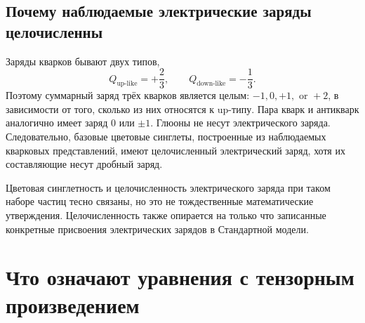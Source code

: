 \subsection{Почему наблюдаемые электрические заряды целочисленны}

Заряды кварков бывают двух типов,
\begin{equation}
Q_{\mathrm{up\text{-}like}}=+\frac23,
\qquad
Q_{\mathrm{down\text{-}like}}=-\frac13.
\end{equation}
Поэтому суммарный заряд трёх кварков является целым: \(-1,0,+1,\text{ or }+2\),
в зависимости от того, сколько из них относятся к up-типу. Пара кварк и антикварк аналогично имеет
заряд \(0\) или \(\pm1\). Глюоны не несут электрического заряда. Следовательно, базовые цветовые
синглеты, построенные из наблюдаемых кварковых представлений, имеют целочисленный электрический
заряд, хотя их составляющие несут дробный заряд.

\begin{classroomqa}
\end{classroomqa}

Цветовая синглетность и целочисленность электрического заряда при таком наборе частиц тесно связаны, но это не тождественные математические утверждения. Целочисленность также опирается на только что записанные конкретные присвоения электрических зарядов в Стандартной модели.

\begin{classroomqa}
\end{classroomqa}

\section{Что означают уравнения с тензорным произведением}

